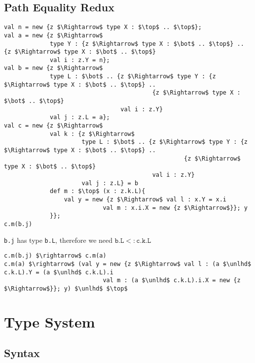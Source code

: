 \documentclass{llncs}
\begin{document}
\subsection{Path Equality Redux}
\begin{lstlisting}[mathescape, style=custom_lang]
val n = new {z $\Rightarrow$ type X : $\top$ .. $\top$};
val a = new {z $\Rightarrow$
             type Y : {z $\Rightarrow$ type X : $\bot$ .. $\top$} .. {z $\Rightarrow$ type X : $\bot$ .. $\top$}
             val i : z.Y = n};
val b = new {z $\Rightarrow$
             type L : $\bot$ .. {z $\Rightarrow$ type Y : {z $\Rightarrow$ type X : $\bot$ .. $\top$} .. 
                                          {z $\Rightarrow$ type X : $\bot$ .. $\top$}
                                 val i : z.Y}
             val j : z.L = a};
val c = new {z $\Rightarrow$
             val k : {z $\Rightarrow$
                      type L : $\bot$ .. {z $\Rightarrow$ type Y : {z $\Rightarrow$ type X : $\bot$ .. $\top$} .. 
                                                   {z $\Rightarrow$ type X : $\bot$ .. $\top$}
                                          val i : z.Y}
                      val j : z.L} = b
             def m : $\top$ (x : z.k.L){
                 val y = new {z $\Rightarrow$ val l : x.Y = x.i 
                            val m : x.i.X = new {z $\Rightarrow$}}; y
             }};
c.m(b.j)
\end{lstlisting}
\texttt{b.j} has type \texttt{b.L}, therefore we need 
$\texttt{b.L} <: \texttt{c.k.L}$
\begin{lstlisting}[mathescape, style=custom_lang]
c.m(b.j) $\rightarrow$ c.m(a)
c.m(a) $\rightarrow$ (val y = new {z $\Rightarrow$ val l : (a $\unlhd$ c.k.L).Y = (a $\unlhd$ c.k.L).i 
                            val m : (a $\unlhd$ c.k.L).i.X = new {z $\Rightarrow$}}; y) $\unlhd$ $\top$
\end{lstlisting}

\section{Type System}
	\label{s:type_sys}


\subsection{Syntax}
\end{document}
